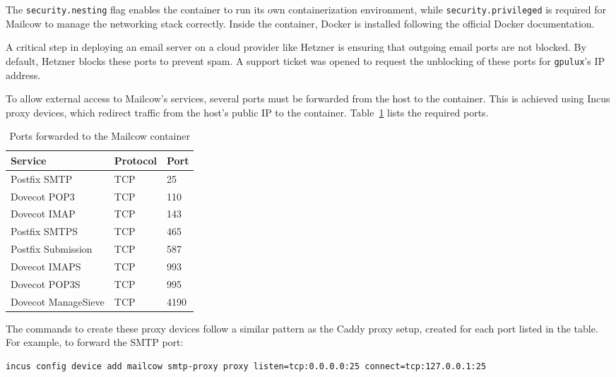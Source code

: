 The \texttt{security.nesting} flag enables the container to run its own containerization environment, while \texttt{security.privileged} is required for Mailcow to manage the networking stack correctly. Inside the container, Docker is installed following the official Docker documentation.

A critical step in deploying an email server on a cloud provider like Hetzner is ensuring that outgoing email ports are not blocked. By default, Hetzner blocks these ports to prevent spam. A support ticket was opened to request the unblocking of these ports for \texttt{gpulux}'s IP address.

To allow external access to Mailcow's services, several ports must be forwarded from the host to the container. This is achieved using Incus proxy devices, which redirect traffic from the host's public IP to the container. Table~\ref{tab:mailcow-ports} lists the required ports\cite{mailcow-prerequisites}.

\begin{table}[H]
    \centering
\caption{Ports forwarded to the Mailcow container}
    \label{tab:mailcow-ports}
    \begin{tabular}{lll}
        \rowcolor{udcpink!25}
        \textbf{Service} & \textbf{Protocol} & \textbf{Port} \\
        \hline
        Postfix SMTP & TCP & 25 \\
        Dovecot POP3 & TCP & 110 \\
        Dovecot IMAP & TCP & 143 \\
        Postfix SMTPS & TCP & 465 \\
        Postfix Submission & TCP & 587 \\
        Dovecot IMAPS & TCP & 993 \\
        Dovecot POP3S & TCP & 995 \\
        Dovecot ManageSieve & TCP & 4190 \\
    \end{tabular}
\end{table}

The commands to create these proxy devices follow a similar pattern as the Caddy proxy setup, created for each port listed in the table. For example, to forward the SMTP port:

\begin{lstlisting}[language=bash,caption={Example command to forward a port to the Mailcow container}]
incus config device add mailcow smtp-proxy proxy listen=tcp:0.0.0.0:25 connect=tcp:127.0.0.1:25
\end{lstlisting}

